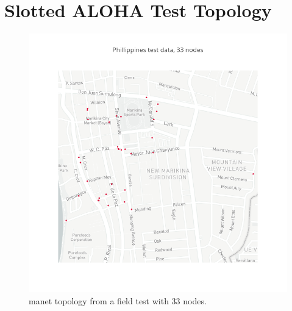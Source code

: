 \chapter{Slotted ALOHA Test Topology}\label{ch:app:aloha-topologies}

\begin{figure}[ht]
    \centering
    \includegraphics[width=.9\textwidth]{figures/phillippines.png}
    \caption{\gls{manet} topology from a field test with 33 nodes.}
    \label{figure:topologyreachi}
\end{figure}

%
